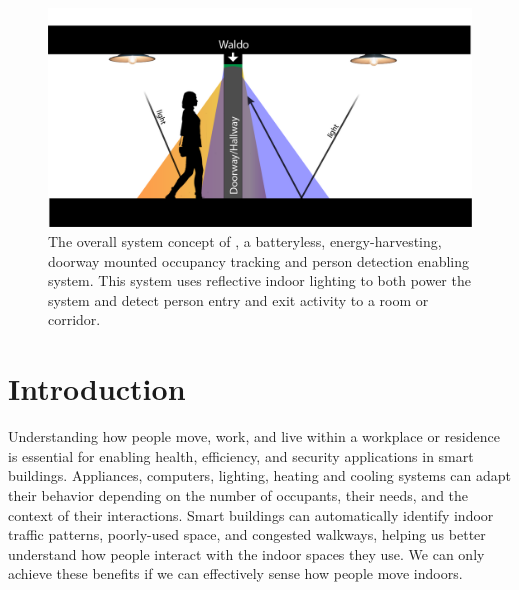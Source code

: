 \begin{figure}[t]
\centering
\includegraphics[width=0.9\columnwidth]{figs/scenario2.png}
\caption{ The overall system concept of \sysname, a batteryless, energy-harvesting, doorway mounted occupancy tracking and person detection enabling system.  This system uses reflective indoor lighting to both power the system and detect person entry and exit activity to a room or corridor.\label{fig:syspic}}
\end{figure}

\section{Introduction}
\label{sec:intro}

Understanding how people move, work, and live within a workplace or residence is essential for enabling health, efficiency, and security applications in smart buildings.
Appliances, computers, lighting, heating and cooling systems can adapt their behavior depending on the number of occupants, their needs, and the context of their interactions.
Smart buildings can automatically identify indoor traffic patterns, poorly-used space, and congested walkways, helping us better understand how people interact with the indoor spaces they use.
We can only achieve these benefits if we can effectively sense how people move indoors.


